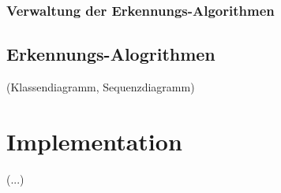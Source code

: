 \subsubsection{Verwaltung der Erkennungs-Algorithmen}

\subsection{Erkennungs-Alogrithmen}

(Klassendiagramm, Sequenzdiagramm)

\section{Implementation}

(...)

